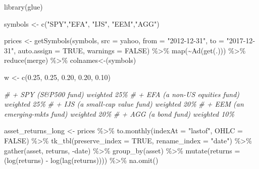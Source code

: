 \documentclass[
]{book}
\newenvironment{Shaded}{\begin{snugshade}}{\end{snugshade}}
\newcommand{\AttributeTok}[1]{\textcolor[rgb]{0.77,0.63,0.00}{#1}}
\newcommand{\CommentTok}[1]{\textcolor[rgb]{0.56,0.35,0.01}{\textit{#1}}}
\newcommand{\ConstantTok}[1]{\textcolor[rgb]{0.00,0.00,0.00}{#1}}
\newcommand{\FloatTok}[1]{\textcolor[rgb]{0.00,0.00,0.81}{#1}}
\newcommand{\FunctionTok}[1]{\textcolor[rgb]{0.00,0.00,0.00}{#1}}
\newcommand{\NormalTok}[1]{#1}
\newcommand{\OtherTok}[1]{\textcolor[rgb]{0.56,0.35,0.01}{#1}}
\newcommand{\SpecialCharTok}[1]{\textcolor[rgb]{0.00,0.00,0.00}{#1}}
\newcommand{\StringTok}[1]{\textcolor[rgb]{0.31,0.60,0.02}{#1}}
\begin{document}
\begin{Shaded}
\begin{Highlighting}[]
\FunctionTok{library}\NormalTok{(glue)}

\NormalTok{symbols }\OtherTok{\textless{}{-}} \FunctionTok{c}\NormalTok{(}\StringTok{"SPY"}\NormalTok{,}\StringTok{"EFA"}\NormalTok{, }\StringTok{"IJS"}\NormalTok{, }\StringTok{"EEM"}\NormalTok{,}\StringTok{"AGG"}\NormalTok{)}



\NormalTok{prices }\OtherTok{\textless{}{-}} 
  \FunctionTok{getSymbols}\NormalTok{(symbols, }\AttributeTok{src =} \StringTok{\textquotesingle{}yahoo\textquotesingle{}}\NormalTok{, }
             \AttributeTok{from =} \StringTok{"2012{-}12{-}31"}\NormalTok{,}
             \AttributeTok{to =} \StringTok{"2017{-}12{-}31"}\NormalTok{,}
             \AttributeTok{auto.assign =} \ConstantTok{TRUE}\NormalTok{, }\AttributeTok{warnings =} \ConstantTok{FALSE}\NormalTok{) }\SpecialCharTok{\%\textgreater{}\%} 
  \FunctionTok{map}\NormalTok{(}\SpecialCharTok{\textasciitilde{}}\FunctionTok{Ad}\NormalTok{(}\FunctionTok{get}\NormalTok{(.))) }\SpecialCharTok{\%\textgreater{}\%}
  \FunctionTok{reduce}\NormalTok{(merge) }\SpecialCharTok{\%\textgreater{}\%} 
  \StringTok{\textasciigrave{}}\AttributeTok{colnames\textless{}{-}}\StringTok{\textasciigrave{}}\NormalTok{(symbols)}

\NormalTok{w }\OtherTok{\textless{}{-}} \FunctionTok{c}\NormalTok{(}\FloatTok{0.25}\NormalTok{, }\FloatTok{0.25}\NormalTok{, }\FloatTok{0.20}\NormalTok{, }\FloatTok{0.20}\NormalTok{, }\FloatTok{0.10}\NormalTok{)}

\CommentTok{\# + SPY (S\&P500 fund) weighted 25\%}
\CommentTok{\# + EFA (a non{-}US equities fund) weighted 25\%}
\CommentTok{\# + IJS (a small{-}cap value fund) weighted 20\%}
\CommentTok{\# + EEM (an emerging{-}mkts fund) weighted 20\%}
\CommentTok{\# + AGG (a bond fund) weighted 10\%}

\NormalTok{asset\_returns\_long }\OtherTok{\textless{}{-}}  
\NormalTok{  prices }\SpecialCharTok{\%\textgreater{}\%} 
  \FunctionTok{to.monthly}\NormalTok{(}\AttributeTok{indexAt =} \StringTok{"lastof"}\NormalTok{, }\AttributeTok{OHLC =} \ConstantTok{FALSE}\NormalTok{) }\SpecialCharTok{\%\textgreater{}\%} 
  \FunctionTok{tk\_tbl}\NormalTok{(}\AttributeTok{preserve\_index =} \ConstantTok{TRUE}\NormalTok{, }\AttributeTok{rename\_index =} \StringTok{"date"}\NormalTok{) }\SpecialCharTok{\%\textgreater{}\%}
  \FunctionTok{gather}\NormalTok{(asset, returns, }\SpecialCharTok{{-}}\NormalTok{date) }\SpecialCharTok{\%\textgreater{}\%} 
  \FunctionTok{group\_by}\NormalTok{(asset) }\SpecialCharTok{\%\textgreater{}\%}  
  \FunctionTok{mutate}\NormalTok{(}\AttributeTok{returns =}\NormalTok{ (}\FunctionTok{log}\NormalTok{(returns) }\SpecialCharTok{{-}} \FunctionTok{log}\NormalTok{(}\FunctionTok{lag}\NormalTok{(returns)))) }\SpecialCharTok{\%\textgreater{}\%} 
  \FunctionTok{na.omit}\NormalTok{()}


\end{Highlighting}
\end{Shaded}
\end{document}
